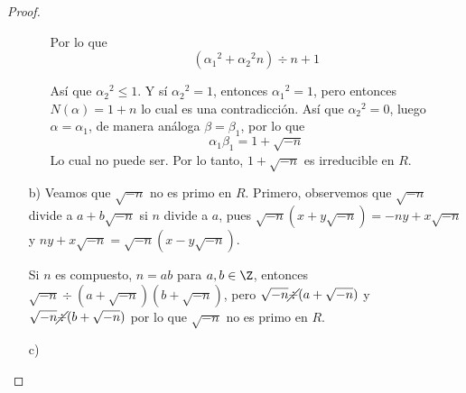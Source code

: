 \begin{proof}
\begin{enumerate}
\begin{itemize}
            Por lo que 
            $$\left( {\alpha_1}^2 + {\alpha_2}^2 n \right) \div n + 1$$

            Así que $ {\alpha_2}^2 \leq 1$. Y sí $ {\alpha_2}^2 = 1$, entonces ${\alpha_1}^2 = 1$, pero entonces $N(\alpha) = 1+n$ lo cual es una contradicción. Así que ${\alpha_2}^2 = 0$, luego $\alpha = \alpha_1$, de manera análoga $\beta = \beta_1$, por lo que
            $$ \alpha_1 \beta_1 = 1 + \sqrt{-n} $$
            Lo cual no puede ser. Por lo tanto, $1+\sqrt{-n}$ es irreducible en $R$.
        \end{itemize}

        \item[b)] Veamos que $\sqrt{-n}$ no es primo en $R$. Primero, observemos que $\sqrt{-n}$ divide a $a + b\sqrt{-n}$ si $n$ divide a $a$, pues $\sqrt{-n}(x + y\sqrt{-n}) = -ny + x\sqrt{-n}$ y $ny + x\sqrt{-n} = \sqrt{-n}(x - y\sqrt{-n})$.
        
        Si $n$ es compuesto, $n = ab$ para $a,b \in \Z$, entonces $\sqrt{-n} \div (a + \sqrt{-n})(b + \sqrt{-n})$, pero $\sqrt{-n} \cancel{\div} (a+\sqrt{-n})$ y $\sqrt{-n} \cancel{\div} (b+\sqrt{-n})$ por lo que $\sqrt{-n}$ no es primo en $R$.

        \item[c)]
        
    \end{enumerate}
\end{proof}